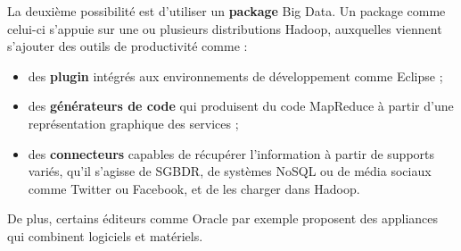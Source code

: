\documentclass[12pt]{article}
\begin{document}
La deuxième possibilité est d'utiliser un \textbf{package} Big Data. Un package comme celui-ci s'appuie sur une ou plusieurs distributions Hadoop, auxquelles viennent s'ajouter des outils de productivité comme :
\begin{itemize}
\item des \textbf{plugin} intégrés aux environnements de développement comme Eclipse ;
\item des \textbf{générateurs de code} qui produisent du code MapReduce à partir d'une représentation graphique des services ;
\item des \textbf{connecteurs} capables de récupérer l'information à partir de supports variés, qu'il s'agisse de SGBDR, de systèmes NoSQL ou de média sociaux comme Twitter ou Facebook, et de les charger dans Hadoop.
\end{itemize}
De plus, certains éditeurs comme Oracle par exemple proposent des appliances qui combinent logiciels et matériels.
\end{document}
